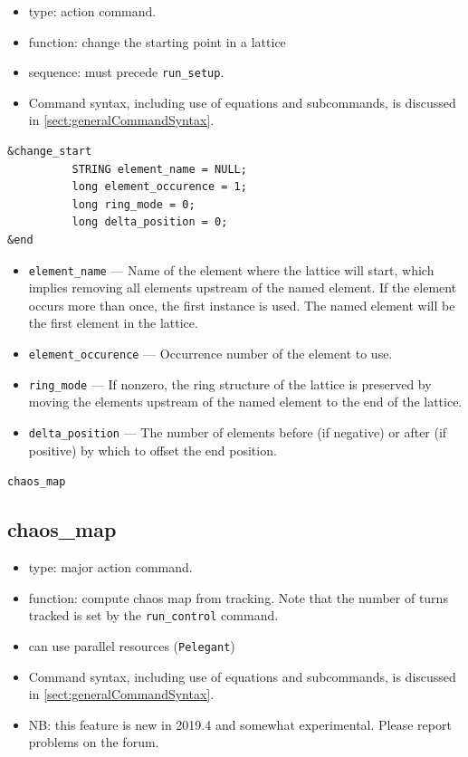 \documentclass[11pt]{article}
\begin{document}
\begin{itemize}
\item type: action command.
\item function: change the starting point in a lattice
\item sequence: must precede \verb|run_setup|.
\item Command syntax, including use of equations and subcommands, is discussed in \ref{sect:generalCommandSyntax}.
\end{itemize}

\begin{verbatim}
&change_start
          STRING element_name = NULL;
          long element_occurence = 1;
          long ring_mode = 0;
          long delta_position = 0;
&end
\end{verbatim}

\begin{itemize}
\item \verb|element_name| --- Name of the element where the lattice will start, which implies removing all 
  elements upstream of the named element. If the element occurs more than once, the first instance is used.
  The named element will be the first element in the lattice.
\item \verb|element_occurence| --- Occurrence number of the element to use.
\item \verb|ring_mode| --- If nonzero, the ring structure of the lattice is preserved by moving the elements 
  upstream of the named element to the end of the lattice.
\item \verb|delta_position| --- The number of elements before (if negative) or after (if positive) by which to
  offset the end position.
\end{itemize}

\newpage
\begin{center}{\Large\verb|chaos_map|}\end{center}
\subsection{chaos\_map \label{subsec:chaosmap}}

\begin{itemize}
\item type: major action command.  
\item function: compute chaos map from tracking.
      Note that the number of turns tracked is set by the \verb|run_control| command.
\item can use parallel resources (\verb|Pelegant|)
\item Command syntax, including use of equations and subcommands, is discussed in \ref{sect:generalCommandSyntax}.
\item NB: this feature is new in 2019.4 and somewhat experimental. Please report problems on the forum.
\end{itemize}
\end{document}
